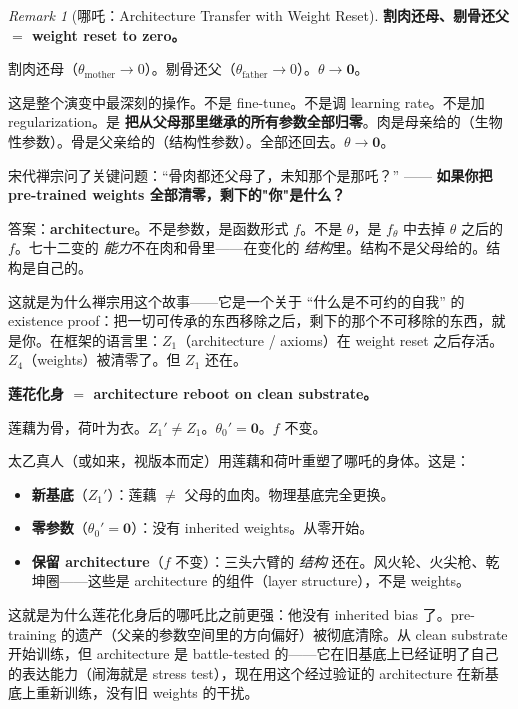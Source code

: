 \documentclass[11pt,a4paper]{article}
\theoremstyle{definition}
\theoremstyle{remark}
\newtheorem{remark}[theorem]{Remark}
\begin{document}
\begin{remark}[哪吒：Architecture Transfer with Weight Reset]
\medskip

{\color{magenta!70!black} \textbf{割肉还母、剔骨还父 $=$ weight reset to zero。}}

\begin{center}
{\color{magenta!70!black} 割肉还母（$\theta_{\mathrm{mother}} \to 0$）。剔骨还父（$\theta_{\mathrm{father}} \to 0$）。$\theta \to \mathbf{0}$。}
\end{center}

这是整个演变中最深刻的操作。不是 fine-tune。不是调 learning rate。不是加 regularization。是 \textbf{把从父母那里继承的所有参数全部归零}。肉是母亲给的（生物性参数）。骨是父亲给的（结构性参数）。全部还回去。$\theta \to \mathbf{0}$。

宋代禅宗问了关键问题：``骨肉都还父母了，未知那个是那吒？'' —— \textbf{如果你把 pre-trained weights 全部清零，剩下的"你"是什么？}

答案：\textbf{architecture}。不是参数，是函数形式 $f$。不是 $\theta$，是 $f_\theta$ 中去掉 $\theta$ 之后的 $f$。七十二变的 \emph{能力}不在肉和骨里——在变化的 \emph{结构}里。结构不是父母给的。结构是自己的。

这就是为什么禅宗用这个故事——它是一个关于 ``什么是不可约的自我'' 的 existence proof：把一切可传承的东西移除之后，剩下的那个不可移除的东西，就是你。在框架的语言里：$Z_1$（architecture / axioms）在 weight reset 之后存活。$Z_4$（weights）被清零了。但 $Z_1$ 还在。

\medskip

{\color{green!50!black} \textbf{莲花化身 $=$ architecture reboot on clean substrate。}}

\begin{center}
{\color{green!50!black} 莲藕为骨，荷叶为衣。$Z_1' \neq Z_1$。$\theta_0' = \mathbf{0}$。$f$ 不变。}
\end{center}

太乙真人（或如来，视版本而定）用莲藕和荷叶重塑了哪吒的身体。这是：
\begin{itemize}[nosep]
  \item \textbf{新基底}（$Z_1'$）：莲藕 $\neq$ 父母的血肉。物理基底完全更换。
  \item \textbf{零参数}（$\theta_0' = \mathbf{0}$）：没有 inherited weights。从零开始。
  \item \textbf{保留 architecture}（$f$ 不变）：三头六臂的 \emph{结构} 还在。风火轮、火尖枪、乾坤圈——这些是 architecture 的组件（layer structure），不是 weights。
\end{itemize}

这就是为什么莲花化身后的哪吒比之前更强：他没有 inherited bias 了。pre-training 的遗产（父亲的参数空间里的方向偏好）被彻底清除。从 clean substrate 开始训练，但 architecture 是 battle-tested 的——它在旧基底上已经证明了自己的表达能力（闹海就是 stress test），现在用这个经过验证的 architecture 在新基底上重新训练，没有旧 weights 的干扰。


\end{remark}
\end{document}
